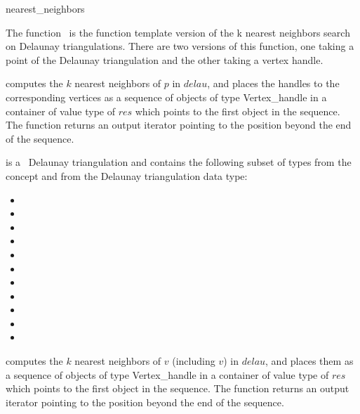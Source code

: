 
\begin{ccRefFunction}{nearest_neighbors}

\ccDefinition

The function \ccRefName\ is the function template version of the k nearest 
neighbors search on Delaunay triangulations.  There are two versions of
this function, one taking a point of the Delaunay triangulation and the
other taking a vertex handle.


{computes the $k$ nearest neighbors of $p$ in $delau$, and places the
handles to the corresponding vertices as a sequence of objects of type
Vertex\_handle in a container of value type of $res$
which points to the first object in the sequence. The function
returns an output iterator pointing to the position beyond the end
of the sequence. }

 is a \cgal\ Delaunay triangulation and contains the following subset of types from the concept  and from
the Delaunay triangulation data type:
\begin{itemize}
  \item {}             
  \item {}                
  \item {}               
  \item {}            
  \item {}                      
  \item {}   
  \item {}                           
  \item {}                              
  \item {}                       
  \item {}                           
  \item {}    
\end{itemize}  

{computes the $k$ nearest neighbors of $v$ (including $v$) in $delau$, and places them as a sequence of objects of type
Vertex\_handle in a container of value type of $res$
which points to the first object in the sequence. The function
returns an output iterator pointing to the position beyond the end
of the sequence. }


\end{ccRefFunction}
